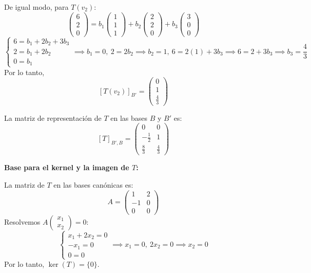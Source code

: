 \begin{prob}
\begin{myproof}
De igual modo, para $T(v_2)$:
\[
\begin{pmatrix} 6 \\ 2 \\ 0 \end{pmatrix} = b_1 \begin{pmatrix} 1 \\ 1 \\ 1 \end{pmatrix} + b_2 \begin{pmatrix} 2 \\ 2 \\ 0 \end{pmatrix} + b_3 \begin{pmatrix} 3 \\ 0 \\ 0 \end{pmatrix}
\]
\[
\begin{cases}
6 = b_1 + 2b_2 + 3b_3 \\
2 = b_1 + 2b_2 \\
0 = b_1
\end{cases}
\implies b_1 = 0,\ 2 = 2b_2 \implies b_2 = 1,\ 6 = 2(1) + 3b_3 \implies 6 = 2 + 3b_3 \implies b_3 = \frac{4}{3}
\]
Por lo tanto,
\[
[T(v_2)]_{B'} = \begin{pmatrix} 0 \\ 1 \\ \frac{4}{3} \end{pmatrix}
\]

La matriz de representación de $T$ en las bases $B$ y $B'$ es:
\[
[T]_{B',B} = \begin{pmatrix}
0 & 0 \\
-\frac{1}{2} & 1 \\
\frac{8}{3} & \frac{4}{3}
\end{pmatrix}
\]

\textbf{Base para el kernel y la imagen de $T$:}

La matriz de $T$ en las bases canónicas es:
\[
A = \begin{pmatrix}
1 & 2 \\
-1 & 0 \\
0 & 0
\end{pmatrix}
\]
Resolvemos $A\begin{pmatrix}x_1\\x_2\end{pmatrix} = 0$:
\[
\begin{cases}
x_1 + 2x_2 = 0 \\
-x_1 = 0 \\
0 = 0
\end{cases}
\implies x_1 = 0,\ 2x_2 = 0 \implies x_2 = 0
\]
Por lo tanto, $\ker(T) = \{0\}$.


\end{myproof}
\end{prob}
